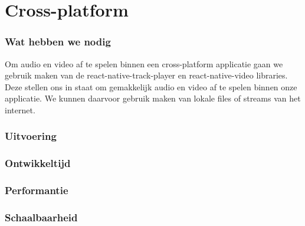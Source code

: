 \section{Cross-platform}
\subsubsection{Wat hebben we nodig}
Om audio en video af te spelen binnen een cross-platform applicatie gaan we gebruik maken van de
react-native-track-player en react-native-video libraries. Deze stellen ons in staat om gemakkelijk 
audio en video af te spelen binnen onze applicatie. We kunnen daarvoor gebruik maken van lokale files
of streams van het internet.

\subsubsection{Uitvoering}



\subsubsection{Ontwikkeltijd}



\subsubsection{Performantie}



\subsubsection{Schaalbaarheid}




